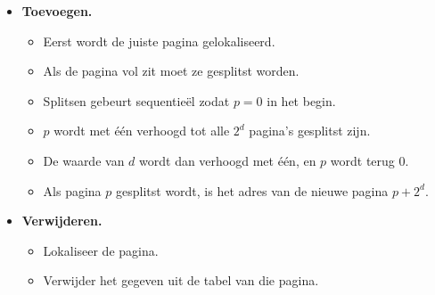 \begin{itemize}
\begin{itemize}
        \item \textbf{Toevoegen.}
        \begin{itemize}
            \item Eerst wordt de juiste pagina gelokaliseerd.
            \item Als de pagina vol zit moet ze gesplitst worden.
            \item Splitsen gebeurt sequentieël zodat $p = 0$ in het begin.
            \item $p$ wordt met één verhoogd tot alle $2^d$ pagina's gesplitst zijn.
            \item De waarde van $d$ wordt dan verhoogd met één, en $p$ wordt terug 0.
            \item Als pagina $p$ gesplitst wordt, is het adres van de nieuwe pagina $p + 2^d$.
        \end{itemize}
        \item \textbf{Verwijderen.}
        \begin{itemize}
            \item Lokaliseer de pagina.
            \item Verwijder het gegeven uit de tabel van die pagina.
            
        \end{itemize}
    \end{itemize}                                                                                                                                                           
\end{itemize}